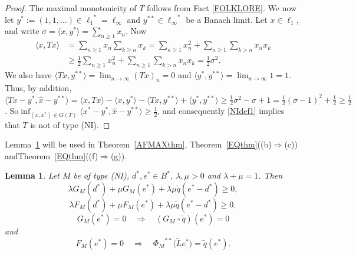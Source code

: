 \documentclass[letterpaper]{article}
\theoremstyle{plain}
\newtheorem{lemma}[theorem]{Lemma}
\theoremstyle{definition}
\numberwithin{equation}{section}
\newcommand{\bra}[2]{\langle#1,#2\rangle}
\newcommand{\dbs}{^{**}}
\newcommand{\half}{{\textstyle\frac{1}{2}}}
\newcommand{\infn}{\inf\nolimits}
\newcommand{\lr}{\Longrightarrow}
\newcommand{\Lt}{{\wt L}}
\newcommand{\qlr}{\quad\Longrightarrow\quad}
\newcommand{\qt}{\wt q}
\newcommand{\ssquare}{\ \square\ }
\newcommand{\ts}{\textstyle}
\newcommand{\wh}{\widehat}
\newcommand{\wt}{\widetilde}
\newcommand{\Lem}{Lemma~\ref}
\newcommand{\Thm}{Theorem~\ref}
\begin{document}
\begin{proof}
The maximal monotonicity of $T$ follows from Fact \ref{FOLKLORE}.   We now let $y^* := (1,1,\dots) \in {\ell_1}^* = \ell_\infty$ and $y\dbs \in {\ell_\infty}^*$ be a Banach limit.   Let $x \in \ell_1$, and write $\sigma = \bra{x}{y^*} = \sum_{n \ge 1}x_n$.     Now 
\begin{align*}
\bra{x}{Tx} &= \ts\sum_{n \ge 1}x_n\sum_{k \ge n}x_k = \sum_{n \ge 1}x_n^2 + \sum_{n \ge 1}\sum_{k > n}x_nx_k\\
&\ge \ts\half\sum_{n \ge 1}x_n^2 + \sum_{n \ge 1}\sum_{k > n}x_nx_k = \half\sigma^2.
\end{align*}
%
We also have $\bra{Tx}{y\dbs} = \lim_{n \to \infty}(Tx)_n = 0$ and $\bra{y^*}{y\dbs} = \lim_{n \to \infty}1 = 1$.   Thus, by addition, $\bra{Tx - y^*}{\wh x - y\dbs} = \bra{x}{Tx} - \bra{x}{y^*} - \bra{Tx}{y\dbs} + \bra{y^*}{y\dbs}
\ge \half\sigma^2 - \sigma + 1 = \half(\sigma - 1)^2 + \half \ge \half$.   So\quad $\infn_{(x,x^*) \in G(T)}\bra{x^* - y^*}{\wh x - y\dbs} \ge \half$, and consequently \eqref{NIdef1} implies that $T$ is not of type (NI). 
\end{proof}
\Lem{GFlem} will be used in \Thm{AFMAXthm},  \Thm{EQthm}\big((b)$\lr$(c)\big) and\break \Thm{EQthm}\big((f)$\lr$(g)\big).
\begin{lemma}\label{GFlem}
Let $M$ be of type (NI), $d^*,e^* \in B^*$, $\lambda,\mu > 0$ and  $\lambda + \mu = 1$.    Then
\begin{equation}\label{G1}
\lambda G_M(d^*) + \mu G_M(e^*) + \lambda\mu\qt(e^* - d^*) \ge 0,
\end{equation}
\begin{equation}\label{F1}
\lambda F_M(d^*) + \mu F_M(e^*) + \lambda\mu\qt(e^* - d^*) \ge 0,
\end{equation}
\begin{equation}\label{FG2}
{G_M}(e^*) = 0 \qlr (G_M \ssquare \qt)(e^*) = 0
\end{equation}
and
\begin{equation}\label{FG3}
F_M(e^*) = 0 \qlr {\Phi_M}\dbs\big(\Lt e^*\big) = \qt(e^*).
\end{equation}        
\end{lemma}
\end{document}
